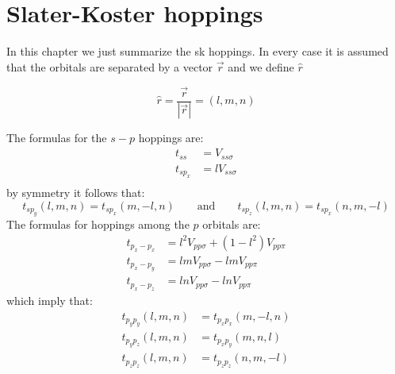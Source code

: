\chapter{Slater-Koster hoppings}
\label{SKhoppings}
In this chapter we just summarize the \ac{sk} hoppings. In every case it is assumed that the orbitals are separated by a vector $\vec{r}$ and we define $\hat{r}$

\begin{equation*}
  \hat{r}=\frac{\vec{r}}{|\vec{r}|} = (l,m,n)
\end{equation*}

The formulas for the $s-p$ hoppings are:
\begin{equation}
\begin{split}
  t_{ss} &= V_{ss\sigma}\\
  t_{sp_x} &= l V_{ss\sigma}\\
\end{split}
\end{equation}
by symmetry it follows that:
\begin{equation}
   t_{sp_y}(l,m,n) = t_{sp_x}(m,-l,n) \qquad \text{and} \qquad
   t_{sp_z}(l,m,n) = t_{sp_x}(n,m,-l)
\end{equation}
The formulas for hoppings among the $p$ orbitals are:
\begin{equation}
\begin{split}
  t_{p_x-p_x} &= l^2 V_{pp\sigma} + \left(1-l^2\right) V_{pp\pi}\\
  t_{p_x-p_y} &= lm V_{pp\sigma} - lm V_{pp\pi}\\
  t_{p_x-p_z} &= ln V_{pp\sigma} - ln V_{pp\pi}
\end{split}
\end{equation}
which imply that:
\begin{equation}
\begin{split}
   t_{p_yp_y}(l,m,n) &= t_{p_xp_x}(m,-l,n) \\
   t_{p_yp_z}(l,m,n) &= t_{p_xp_y}(m,n,l) \\
   t_{p_zp_z}(l,m,n) &= t_{p_zp_z}(n,m,-l)
\end{split}
\end{equation}

